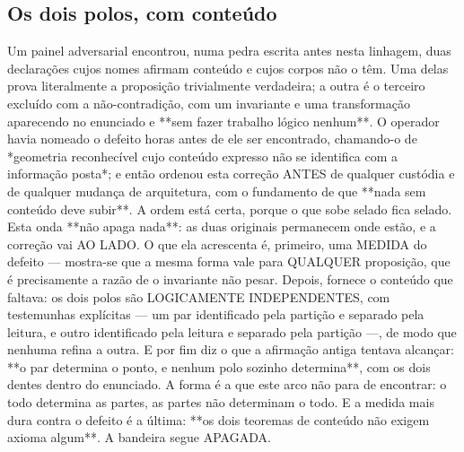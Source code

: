 \documentclass[11pt]{article}
\theoremstyle{definition}\newtheorem{deriv}{Derivação}
\begin{document}
\subsection*{Os dois polos, com conte\'udo}Um painel adversarial encontrou, numa pedra escrita antes nesta linhagem, duas declara\c{c}\~oes cujos nomes afirmam conte\'udo e cujos corpos n\~ao o t\^em. Uma delas prova literalmente a proposi\c{c}\~ao trivialmente verdadeira; a outra \'e o terceiro exclu\'ido com a n\~ao-contradi\c{c}\~ao, com um invariante e uma transforma\c{c}\~ao aparecendo no enunciado e **sem fazer trabalho l\'ogico nenhum**. O operador havia nomeado o defeito horas antes de ele ser encontrado, chamando-o de *geometria reconhec\'ivel cujo conte\'udo expresso n\~ao se identifica com a informa\c{c}\~ao posta*; e ent\~ao ordenou esta corre\c{c}\~ao ANTES de qualquer cust\'odia e de qualquer mudan\c{c}a de arquitetura, com o fundamento de que **nada sem conte\'udo deve subir**. A ordem est\'a certa, porque o que sobe selado fica selado. Esta onda **n\~ao apaga nada**: as duas originais permanecem onde est\~ao, e a corre\c{c}\~ao vai AO LADO. O que ela acrescenta \'e, primeiro, uma MEDIDA do defeito --- mostra-se que a mesma forma vale para QUALQUER proposi\c{c}\~ao, que \'e precisamente a raz\~ao de o invariante n\~ao pesar. Depois, fornece o conte\'udo que faltava: os dois polos s\~ao LOGICAMENTE INDEPENDENTES, com testemunhas expl\'icitas --- um par identificado pela parti\c{c}\~ao e separado pela leitura, e outro identificado pela leitura e separado pela parti\c{c}\~ao ---, de modo que nenhuma refina a outra. E por fim diz o que a afirma\c{c}\~ao antiga tentava alcan\c{c}ar: **o par determina o ponto, e nenhum polo sozinho determina**, com os dois dentes dentro do enunciado. A forma \'e a que este arco n\~ao para de encontrar: o todo determina as partes, as partes n\~ao determinam o todo. E a medida mais dura contra o defeito \'e a \'ultima: **os dois teoremas de conte\'udo n\~ao exigem axioma algum**. A bandeira segue APAGADA.
\end{document}
